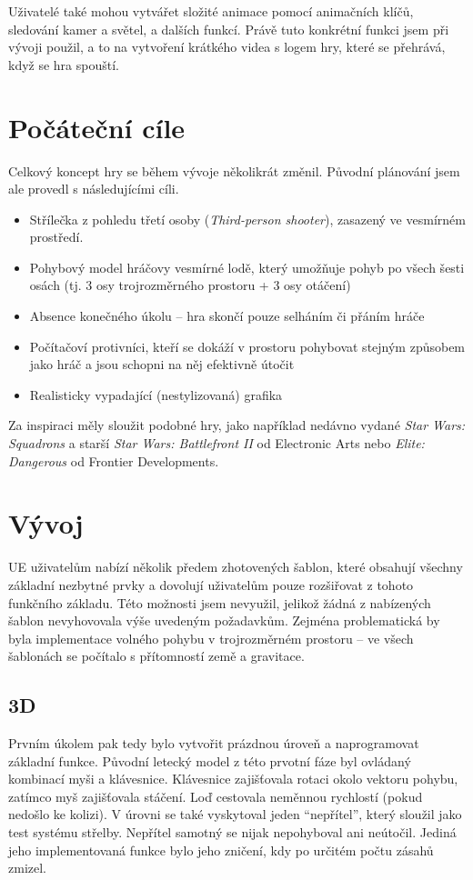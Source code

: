 \documentclass[12pt,a4paper,hidelinks]{article}
\begin{document}
Uživatelé také mohou vytvářet složité animace pomocí animačních klíčů, sledování kamer a světel, a dalších funkcí. Právě tuto konkrétní funkci jsem při vývoji použil, a to na vytvoření krátkého videa s logem hry, které se přehrává, když se hra spouští.
\clearpage

\section{Počáteční cíle}
Celkový koncept hry se během vývoje několikrát změnil. Původní plánování jsem ale provedl s následujícími cíli.
\begin{itemize}
	\item Střílečka z pohledu třetí osoby (\textit{Third-person shooter}), zasazený ve vesmírném prostředí.
	\item Pohybový model hráčovy vesmírné lodě, který umožňuje pohyb po všech šesti osách (tj. 3 osy trojrozměrného prostoru + 3 osy otáčení)
	\item Absence konečného úkolu – hra skončí pouze selháním či přáním hráče
	\item Počítačoví protivníci, kteří se dokáží v prostoru pohybovat stejným způsobem jako hráč a jsou schopni na něj efektivně útočit
	\item Realisticky vypadající (nestylizovaná) grafika
\end{itemize}

Za inspiraci měly sloužit podobné hry, jako například nedávno vydané \textit{Star Wars: Squadrons}\cite{squadrons} a starší \textit{Star Wars: Battlefront II}\cite{bf2} od Electronic Arts nebo \textit{Elite: Dangerous}\cite{elite} od Frontier Developments.

\section{Vývoj}
UE uživatelům nabízí několik předem zhotovených šablon, které obsahují všechny základní nezbytné prvky a dovolují uživatelům pouze rozšiřovat z tohoto funkčního základu. Této možnosti jsem nevyužil, jelikož žádná z nabízených šablon nevyhovovala výše uvedeným požadavkům. Zejména problematická by byla implementace volného pohybu v trojrozměrném prostoru – ve všech šablonách se počítalo s přítomností země a gravitace.

\subsection{3D}
Prvním úkolem pak tedy bylo vytvořit prázdnou úroveň a naprogramovat základní funkce. Původní letecký model z této prvotní fáze byl ovládaný kombinací myši a klávesnice. Klávesnice zajišťovala rotaci okolo vektoru pohybu, zatímco myš zajišťovala stáčení. Loď cestovala neměnnou rychlostí (pokud nedošlo ke kolizi). V úrovni se také vyskytoval jeden \enquote{nepřítel}, který sloužil jako test systému střelby. Nepřítel samotný se nijak nepohyboval ani neútočil. Jediná jeho implementovaná funkce bylo jeho zničení, kdy po určitém počtu zásahů zmizel.
\end{document}
